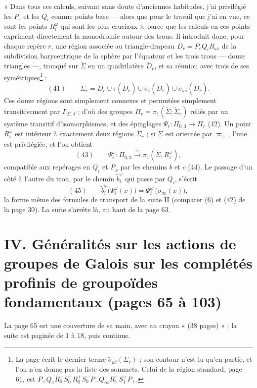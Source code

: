 \documentclass[11pt,a4paper]{article}
\begin{document}
« Dans tous ces calculs, suivant sans doute d'anciennes habitudes, j'ai
privilégié les $P_\varepsilon$ et les $Q_i$ comme points base — alors que pour
le travail que j'ai en vue, ce sont les points $R_i^{\omega}$ qui sont les plus
cruciaux », parce que les calculs en ces points expriment directement la
monodromie autour des trous. Il introduit donc, pour chaque repère $r$, une
région associée au triangle-drapeau $D_r = P_\varepsilon Q_i R_{\omega i}$ de
la subdivision barycentrique de la sphère par l'équateur et les trois
trous — douze triangles —, tronqué sur $\widetilde\Sigma$ en un quadrilatère
$\widetilde D_r$, et sa réunion avec trois de ses symétriques\footnote{La page écrit le dernier terme $\tilde\sigma_{\omega i}(\Sigma_r)$ ;
son contour n'est lu qu'en partie, et l'on n'en donne pas la liste des
sommets. Celui de la région standard, page 61, est
$P_+ Q_1 R_0^- S_0^+ R_0^+ S_0^- P_- Q_\infty R_1^- S_1^+ P_+$.} :
\[
(41)\qquad \widetilde\Sigma_r = \widetilde D_r \cup \tau(\widetilde D_r) \cup \tilde\sigma_i(\widetilde D_r) \cup \tilde\sigma_{\omega i}(\widetilde D_r) .
\]
Ces douze
régions sont simplement connexes et permutées simplement transitivement par
$\Gamma_{\Sigma,J}$ ; d'où des groupes $\Pi_r = \pi_1(\widetilde\Sigma;
\widetilde\Sigma_r)$ reliés par un système transitif d'isomorphismes, et des
épinglages $\Psi_r : \Pi_{0,3} \to \Pi_r$ (42). Un point $R_i^{\omega}$ est
intérieur à exactement deux régions $\widetilde\Sigma_r$ ; si $\Sigma$ est
orientée par $\varpi_+$, l'une est privilégiée, et l'on obtient
\[
(43)\qquad \Psi_i^{\omega} : \Pi_{0,3} \xrightarrow{\ \sim\ } \pi_1(\widetilde\Sigma, R_i^{\omega}) ,
\]
compatible aux repérages en $Q_i$ et $P_\omega$ par les chemins $b$ et $c$
(44). Le passage d'un côté à l'autre du trou, par le chemin $\tilde b_i^{\omega}$
qui passe par $Q_i$, s'écrit
\[
(45)\qquad \tilde b_i^{\omega}\bigl(\Psi_i^{\omega}(x)\bigr) = \Psi_i^{\omega'}\bigl(\sigma_\infty(x)\bigr) ,
\]
la forme même des formules de transport de la suite II (comparer (6) et (42)
de la page 30). La suite s'arrête là, au haut de la page 63.

\section*{IV. Généralités sur les actions de groupes de Galois sur les complétés profinis de groupoïdes fondamentaux (pages 65 à 103)}

La page 65 est une couverture de sa main, avec au crayon « (38 pages) » ; la
suite est paginée de 1 à 18, puis continue.
\end{document}
